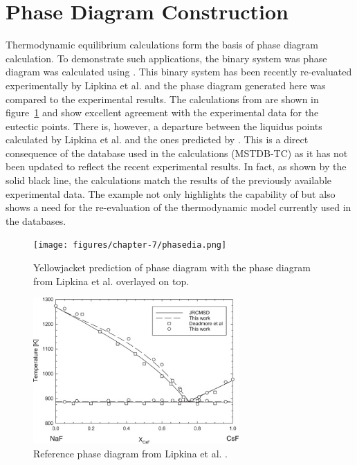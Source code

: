 \section{Phase Diagram Construction}
	Thermodynamic equilibrium calculations form the basis of phase diagram calculation. To demonstrate such applications, the  binary system was phase diagram was calculated using {\GEM}. This binary system has been recently re-evaluated experimentally by Lipkina et al. \cite{Lipkina:2022aa} and the phase diagram generated here was compared to the experimental results. The calculations from {\GEM} are shown in figure~\ref{fig:res_phased} and show excellent agreement with the experimental data for the eutectic points. There is, however, a departure between the liquidus points calculated by Lipkina et al. and the ones predicted by {\YJ}. This is a direct consequence of the database used in the calculations (MSTDB-TC) as it has not been updated to reflect the recent experimental results. In fact, as shown by the solid black line, the calculations match the results of the previously available experimental data. The example not only highlights the capability of {\GEM} but also shows a need for the re-evaluation of the  thermodynamic model currently used in the databases.
\begin{figure}
         \centering
         \texttt{[image: figures/chapter-7/phasedia.png]}
 	 \caption{Yellowjacket prediction of  phase diagram with the phase diagram from Lipkina et al. \cite{Lipkina:2022aa} overlayed on top.}
	 \label{fig:res_phased}
\end{figure}
\begin{figure}
         \centering
         \includegraphics[width=0.7\textwidth]{figures/chapter-7/pdo.png}
         \caption[Reference  phase  diagram from Lipkina et al.]{Reference  phase  diagram from Lipkina et al. \cite{Lipkina:2022aa}.}
     \label{fig:res_refdia}
\end{figure}

